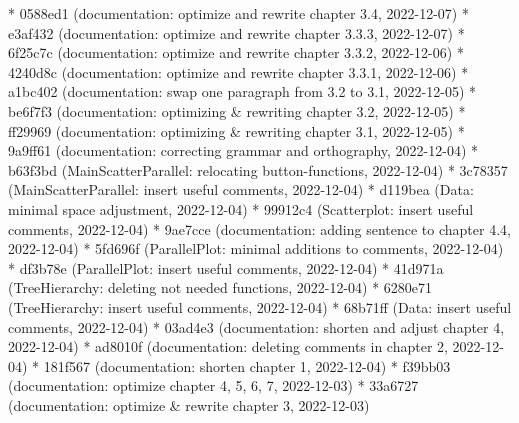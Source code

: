 \documentclass[usegeometry=true]{scrartcl}
\begin{document}
* 0588ed1 (documentation: optimize and rewrite chapter 3.4, 2022-12-07) \newline
* e3af432 (documentation: optimize and rewrite chapter 3.3.3, 2022-12-07)\newline
* 6f25c7c (documentation: optimize and rewrite chapter 3.3.2, 2022-12-06)\newline
* 4240d8c (documentation: optimize and rewrite chapter 3.3.1, 2022-12-06)\newline
* a1bc402 (documentation: swap one paragraph from 3.2 to 3.1, 2022-12-05)\newline
* be6f7f3 (documentation: optimizing \& rewriting chapter 3.2, 2022-12-05) \newline
* ff29969 (documentation: optimizing \& rewriting chapter 3.1, 2022-12-05)\newline
* 9a9ff61 (documentation: correcting grammar and orthography, 2022-12-04)\newline
* b63f3bd (MainScatterParallel: relocating button-functions, 2022-12-04)\newline
* 3c78357 (MainScatterParallel: insert useful comments, 2022-12-04)\newline
* d119bea (Data: minimal space adjustment, 2022-12-04)\newline
* 99912c4 (Scatterplot: insert useful comments, 2022-12-04)\newline
* 9ae7cce (documentation: adding sentence to chapter 4.4, 2022-12-04)\newline
* 5fd696f (ParallelPlot: minimal additions to comments, 2022-12-04)\newline
* df3b78e (ParallelPlot: insert useful comments, 2022-12-04)\newline
* 41d971a (TreeHierarchy: deleting not needed functions, 2022-12-04)\newline
* 6280e71 (TreeHierarchy: insert useful comments, 2022-12-04)\newline
* 68b71ff (Data: insert useful comments, 2022-12-04)\newline
* 03ad4e3 (documentation: shorten and adjust chapter 4, 2022-12-04) \newline
* ad8010f (documentation: deleting comments in chapter 2, 2022-12-04)\newline
* 181f567 (documentation: shorten chapter 1, 2022-12-04)\newline
* f39bb03 (documentation: optimize chapter 4, 5, 6, 7, 2022-12-03)\newline
* 33a6727 (documentation: optimize \& rewrite chapter 3, 2022-12-03)\newline
\end{document}
